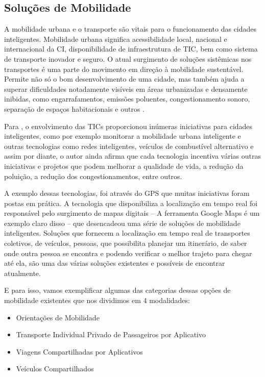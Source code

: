 \subsection{Soluções de Mobilidade}



A mobilidade urbana e o transporte são vitais para o funcionamento das cidades inteligentes. Mobilidade urbana significa acessibilidade local, nacional e internacional da CI, disponibilidade de infraestrutura de TIC, bem como sistema de transporte inovador e seguro.  O atual surgimento de soluções sistêmicas nos transportes é uma parte do movimento em direção à mobilidade sustentável. Permite não só o bom desenvolvimento de uma cidade, mas também ajuda a superar dificuldades notadamente visíveis em áreas urbanizadas e densamente inibidas, como engarrafamentos, emissões poluentes, congestionamento sonoro, separação de espaços habitacionais e outros \cite{opitek}.

Para , o envolvimento das TICs proporcionou inúmeras iniciativas para cidades inteligentes, como por exemplo monitorar a mobilidade urbana inteligente e outras tecnologias como redes inteligentes, veículos de combustível alternativo e assim por diante, o autor ainda afirma que cada tecnologia incentiva várias outras iniciativas e projetos que podem melhorar a qualidade de vida, a redução da poluição, a redução dos congestionamentos, entre outros.

A exemplo dessas tecnologias, foi através do GPS que muitas iniciativas foram postas em prática. A tecnologia  que disponibiliza a localização em tempo real foi responsável pelo surgimento de mapas digitais -- A ferramenta Google Maps é um exemplo claro disso -- que desencadeou uma série de soluções de mobilidade inteligentes. Soluções que fornecem a localização em tempo real de transportes coletivos, de veículos, pessoas, que possibilita planejar um itinerário, de saber onde outra pessoa se encontra e podendo verificar o melhor trajeto para chegar até ela, são uma das várias soluções existentes e possíveis de encontrar atualmente.

E para isso, vamos exemplificar algumas das categorias dessas opções de mobilidade existentes que nos  dividimos em 4 modalidades:
\begin{itemize}
	\item Orientações de Mobilidade
	\item Transporte Individual Privado de Passageiros por Aplicativo
	\item Viagens Compartilhadas por Aplicativos
	\item Veículos Compartilhados
\end{itemize}

